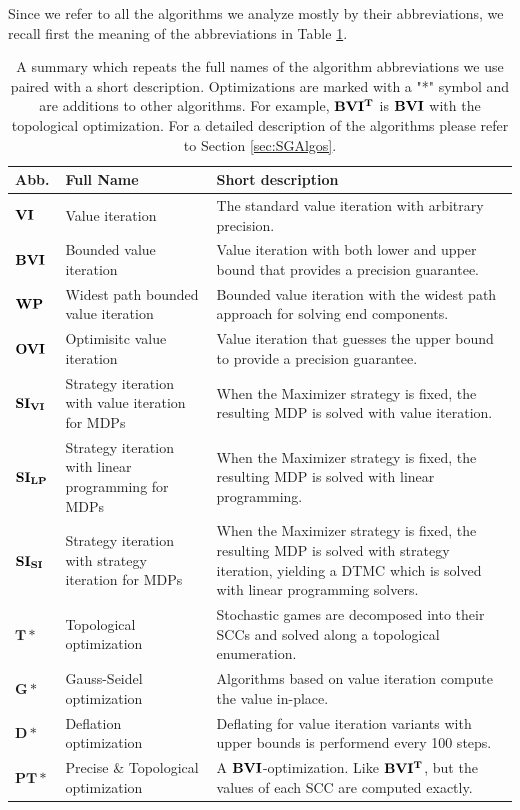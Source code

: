 Since we refer to all the algorithms we analyze mostly by their abbreviations, we recall first the meaning of the abbreviations in Table \ref{tab:recapAlgos}.
\begin{table}[h!]
    \centering
    \begin{tabular}{| p{0.1\linewidth} | p{0.3\linewidth} | p{0.6\linewidth} |}
        \hline
        Abb. & Full Name & Short description \\\hline
        $\mathbf{VI}$ & Value iteration & The standard value iteration with arbitrary precision.\\
        $\mathbf{BVI}$ & Bounded value iteration & Value iteration with both lower and upper bound that provides a precision guarantee.\\
        $\mathbf{WP}$ & Widest path bounded value iteration & Bounded value iteration with the widest path approach for solving end components.\\
        $\mathbf{OVI}$ & Optimisitc value iteration & Value iteration that guesses the upper bound to provide a precision guarantee.\\
        $\mathbf{SI_{VI}}$ & Strategy iteration with value iteration for MDPs & When the Maximizer strategy is fixed, the resulting MDP is solved with value iteration.\\
        $\mathbf{SI_{LP}}$ & Strategy iteration with linear programming for MDPs & When the Maximizer strategy is fixed, the resulting MDP is solved with linear programming.\\
        $\mathbf{SI_{SI}}$ & Strategy iteration with strategy iteration for MDPs & When the Maximizer strategy is fixed, the resulting MDP is solved with strategy iteration, yielding a DTMC which is solved with linear programming solvers.\\
        $\mathbf{T}*$ & Topological optimization & Stochastic games are decomposed into their SCCs and solved along a topological enumeration.\\
        $\mathbf{G}*$ & Gauss-Seidel optimization & Algorithms based on value iteration compute the value in-place.\\
        $\mathbf{D}*$ & Deflation optimization & Deflating for value iteration variants with upper bounds is performend every 100 steps.\\
        $\mathbf{PT}*$ & Precise \& Topological optimization & A $\mathbf{BVI}$-optimization. Like $\mathbf{BVI^T}$, but the values of each SCC are computed exactly.\\
        \hline
    \end{tabular}
    \caption{A summary which repeats the full names of the algorithm abbreviations we use paired with a short description. 
    Optimizations are marked with a "*" symbol and are additions to other algorithms. For example, $\mathbf{BVI^T}$ is $\mathbf{BVI}$ with the topological optimization.
    For a detailed description of the algorithms please refer to Section \ref{sec:SGAlgos}.}
    \label{tab:recapAlgos}
\end{table}


